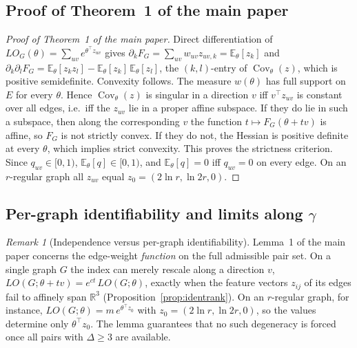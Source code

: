 \documentclass[a5paper, 10pt]{article}
\theoremstyle{plain}
\theoremstyle{remark}
\newtheorem*{remark}{Remark}
\theoremstyle{definition}
\begin{document}
\subsection{Proof of Theorem~1 of the main paper}\label{sec:s-proofs}

  \begin{proof}[Proof of Theorem~1 of the main paper]
  Direct differentiation of
  $LO_G(\theta) = \sum_{uv} e^{\theta^{\top} z_{uv}}$ gives
  $\partial_k F_G = \sum_{uv} w_{uv} z_{uv,k} =
  \mathbb{E}_{\theta}[z_k]$ and
  $\partial_k \partial_l F_G =
  \mathbb{E}_{\theta}[z_k z_l] -
  \mathbb{E}_{\theta}[z_k]\,\mathbb{E}_{\theta}[z_l]$, the
  $(k,l)$-entry of $\operatorname{Cov}_{\theta}(z)$, which is positive
  semidefinite. Convexity follows. The measure $w(\theta)$ has full
  support on $E$ for every $\theta$. Hence
  $\operatorname{Cov}_{\theta}(z)$ is singular in a direction $v$ iff
  $v^{\top} z_{uv}$ is constant over all edges, i.e.\ iff the
  $z_{uv}$ lie in a proper affine subspace. If they do lie in such a
  subspace, then along the corresponding $v$ the function
  $t \mapsto F_G(\theta + tv)$ is affine, so $F_G$ is not strictly
  convex. If they do not, the Hessian is positive definite at every
  $\theta$, which implies strict convexity. This proves the strictness
  criterion. Since $q_{uv} \in [0,1)$,
  $\mathbb{E}_{\theta}[q] \in [0,1)$, and
  $\mathbb{E}_{\theta}[q] = 0$ iff $q_{uv} = 0$ on every edge. On an
  $r$-regular graph all $z_{uv}$ equal
  $z_0 = (2\ln r, \ln 2r, 0)$.
  \end{proof}

\subsection{Per-graph identifiability and limits along $\gamma$}\label{sec:s-ident}

  \begin{remark}[Independence versus per-graph
  identifiability]
  Lemma~1 of the main paper concerns the edge-weight \emph{function} on
  the full admissible pair set. On a single
  graph $G$ the index can merely rescale along a direction $v$,
  $LO(G;\theta + tv) = e^{ct}\,LO(G;\theta)$, exactly when the feature
  vectors $z_{ij}$ of its edges fail to affinely span $\mathbb{R}^3$
  (Proposition~\ref{prop:identrank}). On an $r$-regular graph, for
  instance, $LO(G;\theta) = m\, e^{\theta^{\top} z_0}$ with
  $z_0 = (2\ln r, \ln 2r, 0)$, so the values determine only
  $\theta^{\top} z_0$. The lemma guarantees that no such degeneracy is
  forced once all pairs with $\Delta \ge 3$ are available.
  \end{remark}
\end{document}

